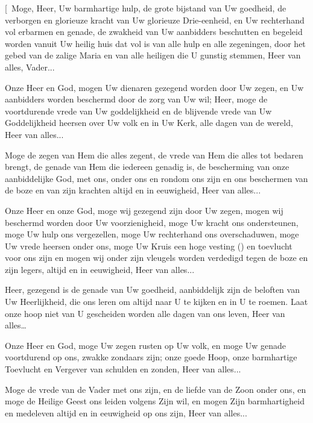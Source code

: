 \documentclass[12pt,twoside,a5paper]{article}
\begin{document}
\begin{halfparskip}
  [\cc~Moge, Heer, Uw barmhartige hulp, de grote bijstand van Uw goedheid, de verborgen en glorieuze kracht van Uw glorieuze Drie-eenheid, en Uw rechterhand vol erbarmen en genade, de zwakheid van Uw aanbidders beschutten en begeleid worden vanuit Uw heilig huis dat vol is van alle hulp en alle zegeningen, door het gebed van de zalige Maria en van alle heiligen die U gunstig stemmen, Heer van alles, Vader...

   Onze Heer en God, mogen Uw dienaren gezegend worden door Uw zegen, en Uw aanbidders worden beschermd door de zorg van Uw wil; Heer, moge de voortdurende vrede van Uw goddelijkheid en de blijvende vrede van Uw Goddelijkheid heersen over Uw volk en in Uw Kerk, alle dagen van de wereld, Heer van alles...

   Moge de zegen van Hem die alles zegent, de vrede van Hem die alles tot bedaren brengt, de genade van Hem die iedereen genadig is, de bescherming van onze aanbiddelijke God, met ons, onder ons en rondom ons zijn en ons beschermen van de boze en van zijn krachten altijd en in eeuwigheid, Heer van alles...

   Onze Heer en onze God, moge wij gezegend zijn door Uw zegen, mogen wij beschermd worden door Uw voorzienigheid, moge Uw kracht ons ondersteunen, moge Uw hulp ons vergezellen, moge Uw rechterhand ons overschaduwen, moge Uw vrede heersen onder ons, moge Uw Kruis een hoge vesting () en toevlucht voor ons zijn en mogen wij onder zijn vleugels worden verdedigd tegen de boze en zijn legers, altijd en in eeuwigheid, Heer van alles...

   Heer, gezegend is de genade van Uw goedheid, aanbiddelijk zijn de beloften van Uw Heerlijkheid, die ons leren om altijd naar U te kijken en in U te roemen. Laat onze hoop niet van U gescheiden worden alle dagen van ons leven, Heer van alles…

   Onze Heer en God, moge Uw zegen rusten op Uw volk, en moge Uw genade voortdurend op ons, zwakke zondaars zijn; onze goede Hoop, onze barmhartige Toevlucht en Vergever van schulden en zonden, Heer van alles...

   Moge de vrede van de Vader met ons zijn, en de liefde van de Zoon onder ons, en moge de Heilige Geest ons leiden volgens Zijn wil, en mogen Zijn barmhartigheid en medeleven altijd en in eeuwigheid op ons zijn, Heer van alles...


\end{halfparskip}
\end{document}
